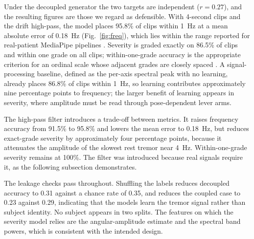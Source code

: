 \documentclass[conference]{IEEEtran}
\begin{document}
Under the decoupled generator the two targets are independent ($r=0.27$), and the
resulting figures are those we regard as defensible. With 4-second clips and the
drift high-pass, the model places 95.8\% of clips within 1~Hz at a mean absolute
error of 0.18~Hz (Fig.~\ref{fig:freq}), which lies within the range reported for
real-patient MediaPipe pipelines \cite{guney2022,friedrich2024}. Severity is graded
exactly on 86.5\% of clips and within one grade on all clips; within-one-grade
accuracy is the appropriate criterion for an ordinal scale whose adjacent grades
are closely spaced \cite{zhang2021}. A signal-processing baseline, defined as the
per-axis spectral peak with no learning, already places 86.8\% of clips within
1~Hz, so learning contributes approximately nine percentage points to frequency;
the larger benefit of learning appears in severity, where amplitude must be read
through pose-dependent lever arms.

\begin{table}[t]
\caption{Subject-held-out results. ``Coupled'' denotes the pipeline's own
labelling and is included only to expose the collinearity. ``+HP'' denotes the
drift high-pass filter.}
\label{tab:main}
\centering
\setlength{\tabcolsep}{4pt}
\end{table}

The high-pass filter introduces a trade-off between metrics. It raises frequency
accuracy from 91.5\% to 95.8\% and lowers the mean error to 0.18~Hz, but reduces
exact-grade severity by approximately four percentage points, because it attenuates
the amplitude of the slowest rest tremor near 4~Hz. Within-one-grade severity
remains at 100\%. The filter was introduced because real signals require it, as the
following subsection demonstrates.

The leakage checks pass throughout. Shuffling the labels reduces decoupled accuracy
to 0.31 against a chance rate of 0.35, and reduces the coupled case to 0.23 against
0.29, indicating that the models learn the tremor signal rather than subject
identity. No subject appears in two splits. The features on which the severity
model relies are the angular-amplitude estimate and the spectral band powers, which
is consistent with the intended design.
\end{document}
